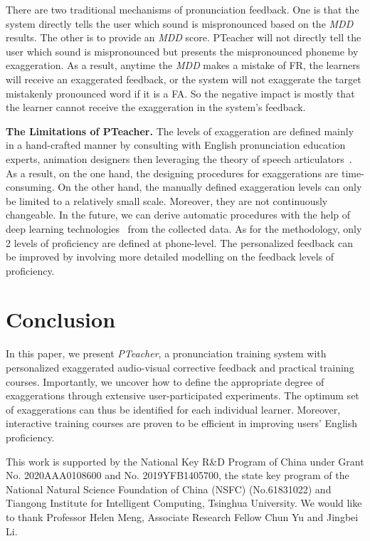 \documentclass[sigconf]{acmart}
\begin{document}
There are two traditional mechanisms of pronunciation feedback. One is that the system directly tells the user which sound is mispronounced based on the \textit{MDD} results. The other is to provide an \textit{MDD} score. PTeacher will not directly tell the user which sound is mispronounced but presents the mispronounced phoneme by exaggeration.
As a result, anytime the \textit{MDD} makes a mistake of FR, the learners will receive an exaggerated feedback, or the system will not exaggerate the target mistakenly pronounced word if it is a FA. So the negative impact is mostly that the learner cannot receive the exaggeration in the system’s feedback.

\noindent\textbf{The Limitations of PTeacher.}
The levels of exaggeration are defined mainly in a hand-crafted manner by consulting with English pronunciation education experts, animation designers then leveraging the theory of speech articulators~\cite{browman1992articulatory, kelly2006teach, kozhevnikov1967speech, chang1993animation, thomas1995illusion}. As a result, on the one hand, the designing procedures for exaggerations are time-consuming. On the other hand, the manually defined exaggeration levels can only be limited to a relatively small scale. Moreover, they are not continuously changeable. In the future, we can derive automatic procedures with the help of deep learning technologies~\cite{zhou2019talking,Yang:2020:MakeItTalk} from the collected data.
As for the methodology, only 2 levels of proficiency are defined at phone-level. The personalized feedback can be improved by involving more detailed modelling on the feedback levels of proficiency.

\section{Conclusion}
In this paper, we present \textit{PTeacher}, a pronunciation training system with personalized exaggerated audio-visual corrective feedback and practical training courses. 
%
Importantly, we uncover how to define the appropriate degree of exaggerations through extensive user-participated experiments.
The optimum set of exaggerations can thus be identified for each individual learner. 
Moreover, interactive training courses are proven to be efficient in improving users' English proficiency.

\begin{acks}
This work is supported by the National Key R\&D Program of China under Grant No. 2020AAA0108600 and No. 2019YFB1405700, the state key program of the National Natural Science Foundation of China (NSFC) (No.61831022) and Tiangong Institute for Intelligent Computing, Tsinghua University. We would like to thank Professor Helen Meng, Associate Research Fellow Chun Yu and Jingbei Li.
\end{acks}

\balance



\end{document}
